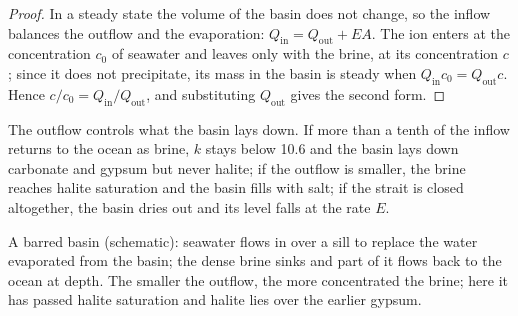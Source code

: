 \begin{proof}
In a steady state the volume of the basin does not change, so the inflow
balances the outflow and the evaporation: $Q_{\mathrm{in}} = Q_{\mathrm{out}} +
EA$. The ion enters at the concentration $c_0$ of seawater and leaves only with
the brine, at its concentration $c$; since it does not precipitate, its mass in
the basin is steady when $Q_{\mathrm{in}}c_0 = Q_{\mathrm{out}}c$. Hence $c/c_0 =
Q_{\mathrm{in}}/Q_{\mathrm{out}}$, and substituting $Q_{\mathrm{out}}$ gives the
second form.
\end{proof}

The outflow controls what the basin lays down. If more than a tenth of the
inflow returns to the ocean as brine, $k$ stays below 10.6 and the basin lays
down carbonate and gypsum but never halite; if the outflow is smaller, the
brine reaches halite saturation and the basin fills with salt; if the strait is
closed altogether, the basin dries out and its level falls at the rate $E$.

\begin{omfigure}

{\small A barred  basin (schematic): seawater flows in over a sill to
replace the water evaporated from the basin; the dense brine sinks and part of
it flows back to the ocean at depth. The smaller the outflow, the more
concentrated the brine; here it has passed halite saturation and halite lies
over the earlier gypsum.}
\label{fig:b1:chemical-biogenic-sediments:barred}
\end{omfigure}

